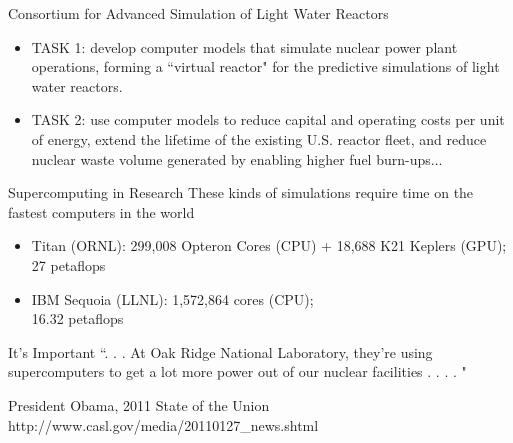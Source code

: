\documentclass[xcolor=x11names,compress]{beamer}
\renewcommand{\(}{\begin{columns}}
\renewcommand{\)}{\end{columns}}
\newcommand{\<}[1]{\begin{column}{#1}}
\renewcommand{\>}{\end{column}}
\begin{document}
\begin{frame}{Consortium for Advanced Simulation of Light Water Reactors}
\begin{center}
\end{center}
\begin{itemize}
\item \textcolor{RawSienna}{TASK 1}: develop computer models that simulate nuclear power plant operations, forming a ``virtual reactor" for the predictive simulations of light water reactors. 
\item \textcolor{RawSienna}{TASK 2}: use computer models to reduce capital and operating costs per unit of energy, extend the lifetime of the existing U.S. reactor fleet, and reduce nuclear waste volume generated by enabling higher fuel burn-ups... %
\end{itemize}
\end{frame}

\begin{frame}{Supercomputing in Research}
These kinds of simulations require time on the fastest computers in the world
\begin{itemize}
\item \textcolor{RawSienna}{Titan} (ORNL): 299,008 Opteron Cores (CPU) + 18,688 K21 Keplers (GPU); 27 petaflops 
\item \textcolor{RawSienna}{IBM Sequoia} (LLNL): 1,572,864 cores (CPU); \\16.32 petaflops
\end{itemize}
\begin{figure}
\hfill
\end{figure}
\end{frame}

\begin{frame}{It's Important}
``. . . At Oak Ridge National Laboratory, they're using supercomputers to get a lot more power out of our nuclear facilities . . . . "

\vspace*{0.5 in}
President Obama, 2011 State of the Union\\
http://www.casl.gov/media/20110127\_news.shtml
\end{frame}
\end{document}
